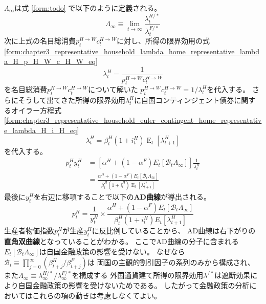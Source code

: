 \(\Lambda_{\infty}\)は式
\eqref{form:todo}
で以下のように定義される。
\begin{equation}
\label{form:chapter5_asad_ad_Lambda_infty_def}
    \Lambda_{\infty}\equiv\lim_{t\to\infty}\frac{\lambda_t^{H/*}}{\lambda_t^{F/*}}
\end{equation}
次に上式の名目総消費\(p_t^{H\to W}c_t^{H\to W}\)に対し、所得の限界効用の式
\eqref{form:chapter3_representative_household_lambda_home_representative_lambda_H_p_H_W_c_H_W_eq}
\begin{equation}
\label{form:chapter5_asad_ad_lambda_H_p_H_W_c_H_W_eq}
    \lambda_t^H=\frac{1}{p_t^{H\to W}c_t^{H\to W}}
\end{equation}
を名目総消費\(p_t^{H\to W}c_t^{H\to W}\)について解いた
\(p_t^{H\to W}c_t^{H\to W}=1/\lambda_t^H\)を代入する。
さらにそうして出てきた所得の限界効用\(\lambda_t^H\)に自国コンティンジェント債券に関するオイラー方程式
\eqref{form:chapter3_representative_household_euler_contingent_home_representative_lambda_H_i_H_eq}
\begin{equation}
\label{form:chapter5_asad_ad_lambda_H_i_H_eq}
    \lambda_t^H=\beta_t^H(1+i_t^H)\operatorname{E}_t[\lambda_{t+1}^H]
\end{equation}
を代入する。
\begin{align}
\label{form:chapter5_asad_ad_p_H_y_H_modified_eq}
    p_t^Hy_t^H
    &=\left[\alpha^H+(1-\alpha^F)E_t[\mathcal{B}_t\Lambda_{\infty}]\right]\frac{1}{\lambda_t^H} \nonumber \\
    &=\frac{\alpha^H+(1-\alpha^F)E_t[\mathcal{B}_t\Lambda_{\infty}]}{\beta_t^H(1+i_t^H)\operatorname{E}_t[\lambda_{t+1}^H]}
\end{align}
最後に\(y_t^H\)を右辺に移項することで以下の\textbf{AD曲線}が導出される。
\begin{equation}
\label{form:chapter5_asad_ad_p_H_eq}
p_t^H=\frac{1}{y_t^H}\times\frac{\alpha^H+(1-\alpha^F)E_t[\mathcal{B}_t\Lambda_{\infty}]}{\beta_t^H(1+i_t^H)E_t[\lambda_{t+1}^H]}
\end{equation}
生産者物価指数\(p_t^H\)が生産\(y_t^H\)に反比例していることから、
AD曲線は右下がりの\textbf{直角双曲線}となっていることがわかる。
ここでAD曲線の分子に含まれる\(E_t[\mathcal{B}_t\Lambda_{\infty}]\)は自国金融政策の影響を受けない。
なぜなら\(\mathcal{B}_t\equiv\prod_{j=0}^{\infty}(\beta_{t+j}^H/\beta_{t+j}^F)\)は
両国の主観的割引因子の系列のみから構成され、
また\(\Lambda_{\infty}\equiv\lambda_{\infty}^{H/*}/\lambda_{\infty}^{F/*}\)を構成する
外国通貨建て所得の限界効用\(\lambda^{/*}\)は遮断効果により自国金融政策の影響を受けないためである。
したがって金融政策の分析においてはこれらの項の動きは考慮しなくてよい。